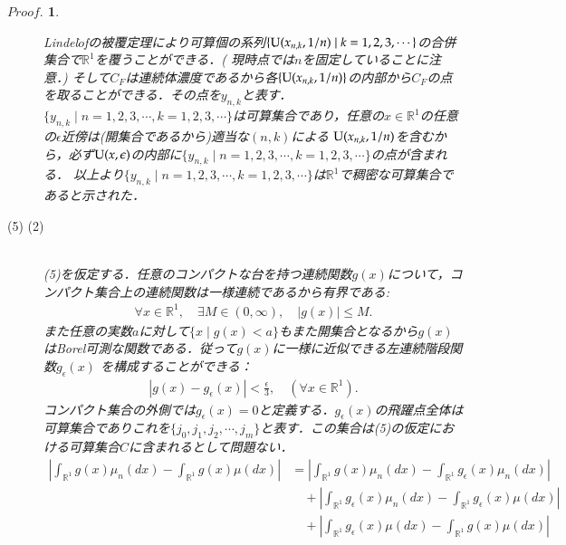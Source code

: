 \documentclass[a4j,papersize,disablejfam,slide,14pt]{jsarticle}
\newtheorem{Proof}{$Proof.$}
\begin{document}
\begin{Proof}
\begin{description}
                {\rm Lindel$\ddot{o}$f}の被覆定理により可算個の系列$\{{\rm U}(x_{n,k}, 1/n) \mid k=1,2,3,\cdots\}$の合併集合で$\mathbb{R}^1$を覆うことができる．(
                現時点では$n$を固定していることに注意．)
                そして$C_F$は連続体濃度であるから各$\{{\rm U}(x_{n,k}, 1/n)\}$の内部から$C_F$の点を取ることができる．その点を$y_{n,k}$と表す．
                $\{y_{n,k} \mid n=1,2,3,\cdots, k=1,2,3,\cdots\}$は可算集合であり，任意の$x \in \mathbb{R}^1$の任意の$\epsilon$近傍は(開集合であるから)適当な$(n,k)$による
                ${\rm U}(x_{n,k}, 1/n)$を含むから，必ず${\rm U}(x, \epsilon)$の内部に$\{y_{n,k} \mid n=1,2,3,\cdots, k=1,2,3,\cdots\}$の点が含まれる．
                以上より$\{y_{n,k} \mid n=1,2,3,\cdots, k=1,2,3,\cdots\}$は$\mathbb{R}^1$で稠密な可算集合であると示された．
            \item[{\large (5) \to (2)}]\mbox{}\\
            	(5)を仮定する．任意のコンパクトな台を持つ連続関数$g(x)$について，コンパクト集合上の連続関数は一様連続であるから有界である:
                \begin{align}
                	\forall x \in \mathbb{R}^1,\quad \exists M \in (0, \infty),\quad |g(x)| \leq M.
                \end{align}
                また任意の実数$a$に対して$\{x \mid g(x) < a\}$もまた開集合となるから$g(x)$は{\rm Borel}可測な関数である．従って$g(x)$に一様に近似できる左連続階段関数$g_\epsilon(x)$
                を構成することができる：
                \begin{align}
                	|g(x) - g_\epsilon(x)| < \frac{\epsilon}{3}, \quad (\forall x \in \mathbb{R}^1).
                \end{align}
                コンパクト集合の外側では$g_\epsilon(x)=0$と定義する．$g_\epsilon(x)$の飛躍点全体は可算集合でありこれを$\{ j_0, j_1, j_2, \cdots, j_m \}$と表す．この集合は(5)の仮定における可算集合$C$に含まれるとして問題ない．
                \begin{align}
                	\left| \int_{\mathbb{R}^1} g(x) \mu_n(dx) - \int_{\mathbb{R}^1} g(x) \mu(dx) \right| 
                    &= \left| \int_{\mathbb{R}^1} g(x) \mu_n(dx) - \int_{\mathbb{R}^1} g_\epsilon(x) \mu_n(dx) \right| \\
                    	&\quad+ \left| \int_{\mathbb{R}^1} g_\epsilon(x) \mu_n(dx) - \int_{\mathbb{R}^1} g_\epsilon(x) \mu(dx) \right| \\
                        &\quad+ \left| \int_{\mathbb{R}^1} g_\epsilon(x) \mu(dx) - \int_{\mathbb{R}^1} g(x) \mu(dx) \right| \\

\end{align}
\end{description}
\end{Proof}
\end{document}

